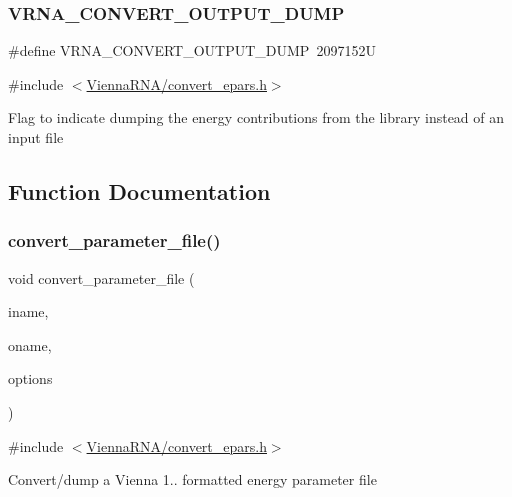 \subsubsection{\texorpdfstring{V\+R\+N\+A\+\_\+\+C\+O\+N\+V\+E\+R\+T\+\_\+\+O\+U\+T\+P\+U\+T\+\_\+\+D\+U\+MP}{VRNA\_CONVERT\_OUTPUT\_DUMP}}
{\footnotesize\ttfamily \#define V\+R\+N\+A\+\_\+\+C\+O\+N\+V\+E\+R\+T\+\_\+\+O\+U\+T\+P\+U\+T\+\_\+\+D\+U\+MP~2097152U}



{\ttfamily \#include $<$\mbox{\hyperlink{convert__epars_8h}{Vienna\+R\+N\+A/convert\+\_\+epars.\+h}}$>$}

Flag to indicate dumping the energy contributions from the library instead of an input file 

\subsection{Function Documentation}
\mbox{\label{group__energy__parameters__convert_gafbe538bc4eb2cf2a33326e1010005f8a}} 
\subsubsection{\texorpdfstring{convert\+\_\+parameter\+\_\+file()}{convert\_parameter\_file()}}
{\footnotesize\ttfamily void convert\+\_\+parameter\+\_\+file (\begin{DoxyParamCaption}\item[{const char $\ast$}]{iname,  }\item[{const char $\ast$}]{oname,  }\item[{unsigned int}]{options }\end{DoxyParamCaption})}



{\ttfamily \#include $<$\mbox{\hyperlink{convert__epars_8h}{Vienna\+R\+N\+A/convert\+\_\+epars.\+h}}$>$}

Convert/dump a Vienna 1.. formatted energy parameter file

